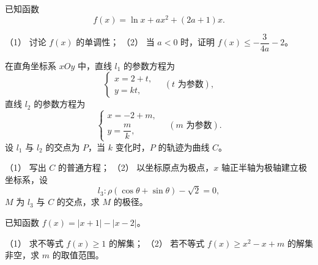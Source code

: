 \begin{question}
已知函数
\nopagebreak[4]
\[
f(x)=\ln x+ax^2+(2a+1)x.
\]

（1） 讨论 \(f(x)\) 的单调性；
（2） 当 \(a<0\) 时，证明 \(f(x)\leq-\dfrac{3}{4a}-2\)。

\end{question}
\begin{question}
在直角坐标系 \(xOy\) 中，直线 \(l_1\) 的参数方程为
\nopagebreak[4]
\[
\begin{cases}
x=2+t,\\
y=kt,
\end{cases}
\quad(t\text{ 为参数}),
\]
直线 \(l_2\) 的参数方程为
\nopagebreak[4]
\[
\begin{cases}
x=-2+m,\\
y=\dfrac{m}{k},
\end{cases}
\quad(m\text{ 为参数}).
\]
设 \(l_1\) 与 \(l_2\) 的交点为 \(P\)，当 \(k\) 变化时，\(P\) 的轨迹为曲线 \(C\)。

（1） 写出 \(C\) 的普通方程；
（2） 以坐标原点为极点，\(x\) 轴正半轴为极轴建立极坐标系，设
\nopagebreak[4]
\[
l_3:\rho(\cos\theta+\sin\theta)-\sqrt{2}=0,
\]
\(M\) 为 \(l_3\) 与 \(C\) 的交点，求 \(M\) 的极径。

\enlargethispage{4\baselineskip}
\end{question}
\begin{question}
已知函数 \(f(x)=|x+1|-|x-2|\)。

（1） 求不等式 \(f(x)\geq 1\) 的解集；
（2） 若不等式 \(f(x)\geq x^2-x+m\) 的解集非空，求 \(m\) 的取值范围。

\end{question}